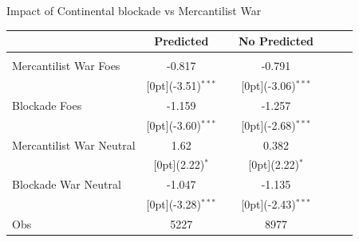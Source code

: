 \documentclass[11pt]{beamer}
\begin{document}
\begin{frame}{Impact of Continental blockade vs Mercantilist War}
\begin{tabular*}{\textwidth}{@{\extracolsep{\fill}}lcccccc}						
 &	\multicolumn{1}{c}{Predicted} &	\multicolumn{1}{c}{} & \multicolumn{1}{c}{No Predicted} & \\
\hline					
\hline \\					
Mercantilist War Foes & -0.817 &  &	-0.791  &\\
&	\raisebox{.7ex}[0pt]{\scriptsize (-3.51)$^{***}$} 	& &	\raisebox{.7ex}[0pt]{\scriptsize (-3.06)$^{***}$} & &\\
Blockade Foes & -1.159	 && -1.257	&  &\\
 &	\raisebox{.7ex}[0pt]{\scriptsize (-3.60)$^{***}$} & &	 \raisebox{.7ex}[0pt]{\scriptsize (-2.68)$^{***}$}	& \\
Mercantilist War Neutral &	1.62 && 0.382	&  \\
 &	\raisebox{.7ex}[0pt]{\scriptsize (2.22)$^{*}$}  &	&	\raisebox{.7ex}[0pt]{\scriptsize (2.22)$^{*}$} & \\
Blockade War Neutral	 &	-1.047 & & -1.135	& \\
 &	\raisebox{.7ex}[0pt]{\scriptsize (-3.28)$^{***}$} & &	 \raisebox{.7ex}[0pt]{\scriptsize (-2.43)$^{***}$} 	& \\
\hline \hline
Obs  &	5227 &	&  8977 & \\

\hline\hline						
\end{tabular*}%
\end{frame}
\end{document}
